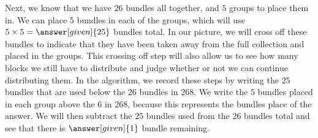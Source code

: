 \documentclass{ximera}
\begin{document}
\begin{example}
\begin{image}
\end{image}

\begin{image}
\end{image}

Next, we know that we have $26$ bundles all together, and $5$ groups to place them in. We can place $5$ bundles in each of the groups, which will use $5 \times 5 = \answer[given]{25}$ bundles total. In our picture, we will cross off these bundles to indicate that they have been taken away from the full collection and placed in the groups. This crossing off step will also allow us to see how many blocks we still have to distribute and judge whether or not we can continue distributing them. In the algorithm, we record these steps by writing the $25$ bundles that are used below the $26$ bundles in $268$. We write the $5$ bundles placed in each group above the $6$ in $268$, because this represents the bundles place of the answer. We will then subtract the $25$ bundles used from the $26$ bundles total and see that there is $\answer[given]{1}$ bundle remaining.


\end{example}
\end{document}
